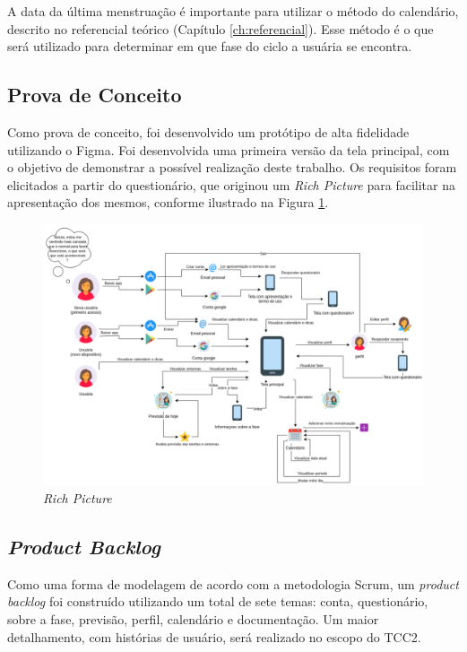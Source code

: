 A data da última menstruação é importante para utilizar o 
método do calendário, descrito no referencial teórico (Capítulo \ref{ch:referencial}). 
Esse método é o que será utilizado para determinar em que 
fase do ciclo a usuária se encontra.

\subsection{Prova de Conceito}
 
Como prova de conceito, foi desenvolvido um protótipo de alta 
fidelidade utilizando o Figma. Foi desenvolvida uma primeira versão da tela principal, 
com o objetivo de demonstrar a possível 
realização deste trabalho. Os requisitos foram elicitados 
a partir do questionário, que 
originou um \emph{Rich Picture} para facilitar na apresentação dos mesmos, conforme ilustrado na Figura \ref{fig08}.

\begin{figure}[h]
	\centering
	\includegraphics[keepaspectratio=true,scale=0.8]{figuras/rickPicture.pdf}
	\caption{\emph{Rich Picture}}
        \label{fig08}
\end{figure}

\subsection{\emph{Product Backlog}}
Como uma forma de modelagem de acordo com a metodologia Scrum, 
um \emph{product backlog} foi construído utilizando um total de 
sete temas: conta, questionário, sobre a fase, previsão, perfil, 
calendário e documentação. Um maior 
detalhamento, com histórias de usuário, será realizado no 
escopo do TCC2.

